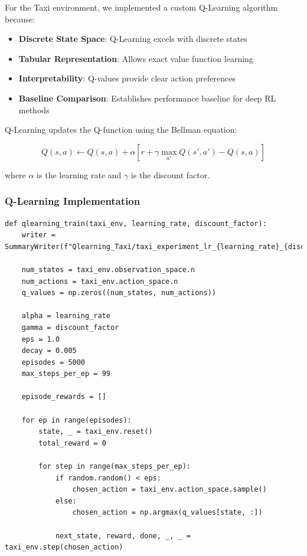 \documentclass[12pt]{article}
\begin{document}
{{{For the Taxi environment, we implemented a custom Q-Learning algorithm because:

\begin{itemize}
    \item \textbf{Discrete State Space}: Q-Learning excels with discrete states
    \item \textbf{Tabular Representation}: Allows exact value function learning
    \item \textbf{Interpretability}: Q-values provide clear action preferences
    \item \textbf{Baseline Comparison}: Establishes performance baseline for deep RL methods
\end{itemize}

Q-Learning updates the Q-function using the Bellman equation:

\begin{equation}
Q(s,a) \leftarrow Q(s,a) + \alpha [r + \gamma \max_{a'} Q(s',a') - Q(s,a)]
\end{equation}

where $\alpha$ is the learning rate and $\gamma$ is the discount factor.

\subsubsection{Q-Learning Implementation}

\begin{verbatim}
def qlearning_train(taxi_env, learning_rate, discount_factor):
    writer = SummaryWriter(f"Qlearning_Taxi/taxi_experiment_lr_{learning_rate}_{discount_factor}")
    
    num_states = taxi_env.observation_space.n
    num_actions = taxi_env.action_space.n
    q_values = np.zeros((num_states, num_actions))
    
    alpha = learning_rate
    gamma = discount_factor
    eps = 1.0
    decay = 0.005
    episodes = 5000
    max_steps_per_ep = 99
    
    episode_rewards = []
    
    for ep in range(episodes):
        state, _ = taxi_env.reset()
        total_reward = 0
    
        for step in range(max_steps_per_ep):
            if random.random() < eps:
                chosen_action = taxi_env.action_space.sample()
            else:
                chosen_action = np.argmax(q_values[state, :])
            
            next_state, reward, done, _, _ = taxi_env.step(chosen_action)
            

\end{verbatim}}}}
\end{document}
